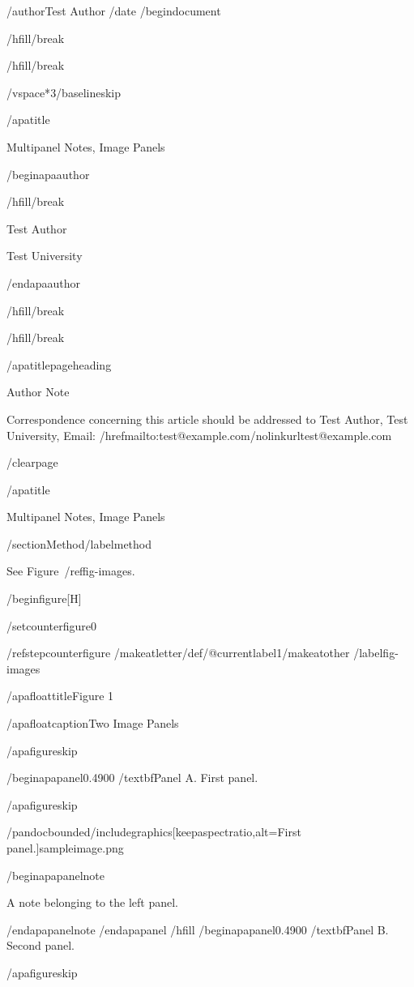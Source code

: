 /author{Test Author}
/date{}
/begin{document}


/hfill/break

/hfill/break

/vspace*{3/baselineskip}

/apatitle{

Multipanel Notes, Image Panels

}

/begin{apaauthor}

/hfill/break

Test Author

Test University

/end{apaauthor}

/hfill/break

/hfill/break

/apatitlepageheading{

Author Note

}

Correspondence concerning this article should be addressed to Test
Author, Test University, Email:
/href{mailto:test@example.com}{/nolinkurl{test@example.com}}

/clearpage

/apatitle{

Multipanel Notes, Image Panels

}

/section{Method}/label{method}

See Figure~/ref{fig-images}.

/begin{figure}[H]

/setcounter{figure}{0}

/refstepcounter{figure}%
/makeatletter/def/@currentlabel{1}/makeatother%
/label{fig-images}

/apafloattitle{Figure 1}

/apafloatcaption{Two Image Panels}

/apafigureskip

/begin{apapanel}{0.4900}%
/textbf{Panel A}. First panel.

/apafigureskip

/pandocbounded{/includegraphics[keepaspectratio,alt={First panel.}]{sampleimage.png}}

/begin{apapanelnote}

A note belonging to the left panel.

/end{apapanelnote}
/end{apapanel}%
/hfill
/begin{apapanel}{0.4900}%
/textbf{Panel B}. Second panel.

/apafigureskip


